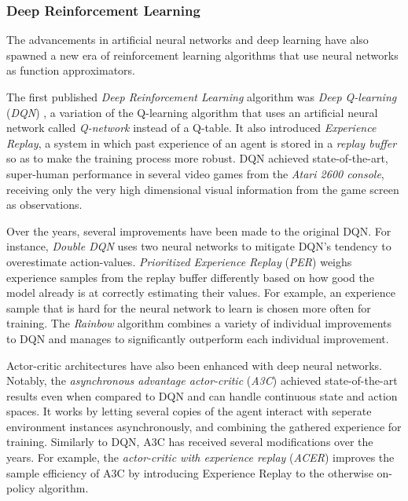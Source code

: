 \subsubsection{Deep Reinforcement Learning}
The advancements in artificial neural networks and deep learning have also spawned a new era of reinforcement learning algorithms that use neural networks as function approximators.

The first published \textit{Deep Reinforcement Learning} algorithm was \textit{Deep Q-learning} (\textit{DQN}) \cite{dqn}, a variation of the Q-learning algorithm that uses an artificial neural network called \textit{Q-network} instead of a Q-table. It also introduced \textit{Experience Replay}, a system in which past experience of an agent is stored in a \textit{replay buffer} so as to make the training process more robust. DQN achieved state-of-the-art, super-human performance in several video games from the \textit{Atari 2600 console}, receiving only the very high dimensional visual information from the game screen as observations.

Over the years, several improvements have been made to the original DQN. For instance, \textit{Double DQN} \cite{double-dqn} uses two neural networks to mitigate DQN's tendency to overestimate action-values. \textit{Prioritized Experience Replay} (\textit{PER}) \cite{per} weighs experience samples from the replay buffer differently based on how good the model already is at correctly estimating their values. For example, an experience sample that is hard for the neural network to learn is chosen more often for training. The \textit{Rainbow} algorithm \cite{rainbow} combines a variety of individual improvements to DQN and manages to significantly outperform each individual improvement.

Actor-critic architectures have also been enhanced with deep neural networks. Notably, the \textit{asynchronous advantage actor-critic} (\textit{A3C}) \cite{a3c} achieved state-of-the-art results even when compared to DQN and can handle continuous state and action spaces. It works by letting several copies of the agent interact with seperate environment instances asynchronously, and combining the gathered experience for training. Similarly to DQN, A3C has received several modifications over the years. For example, the \textit{actor-critic with experience replay} (\textit{ACER}) \cite{acer} improves the sample efficiency of A3C by introducing Experience Replay to the otherwise on-policy algorithm.